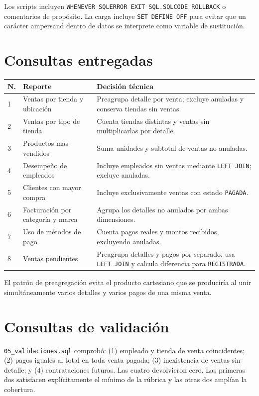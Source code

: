 \documentclass[10pt,letterpaper]{article}
\begin{document}
Los scripts incluyen \texttt{WHENEVER SQLERROR EXIT SQL.SQLCODE ROLLBACK} o comentarios de propósito. La carga incluye \texttt{SET DEFINE OFF} para evitar que un carácter ampersand dentro de datos se interprete como variable de sustitución.

\section{Consultas entregadas}
\begin{longtable}{p{.6cm}p{4.1cm}p{10.5cm}}\toprule N.&Reporte&Decisión técnica\\\midrule\endhead
1&Ventas por tienda y ubicación&Preagrupa detalle por venta; excluye anuladas y conserva tiendas sin ventas.\\
2&Ventas por tipo de tienda&Cuenta tiendas distintas y ventas sin multiplicarlas por detalle.\\
3&Productos más vendidos&Suma unidades y subtotal de ventas no anuladas.\\
4&Desempeño de empleados&Incluye empleados sin ventas mediante \texttt{LEFT JOIN}; excluye anuladas.\\
5&Clientes con mayor compra&Incluye exclusivamente ventas con estado \texttt{PAGADA}.\\
6&Facturación por categoría y marca&Agrupa los detalles no anulados por ambas dimensiones.\\
7&Uso de métodos de pago&Cuenta pagos reales y montos recibidos, excluyendo anuladas.\\
8&Ventas pendientes&Preagrupa detalles y pagos por separado, usa \texttt{LEFT JOIN} y calcula diferencia para \texttt{REGISTRADA}.\\\bottomrule\end{longtable}

El patrón de preagregación evita el producto cartesiano que se produciría al unir simultáneamente varios detalles y varios pagos de una misma venta.

\section{Consultas de validación}
\texttt{05\_validaciones.sql} comprobó: (1) empleado y tienda de venta coincidentes; (2) pagos iguales al total en toda venta pagada; (3) inexistencia de ventas sin detalle; y (4) contrataciones futuras. Las cuatro devolvieron cero. Las primeras dos satisfacen explícitamente el mínimo de la rúbrica y las otras dos amplían la cobertura.
\end{document}

